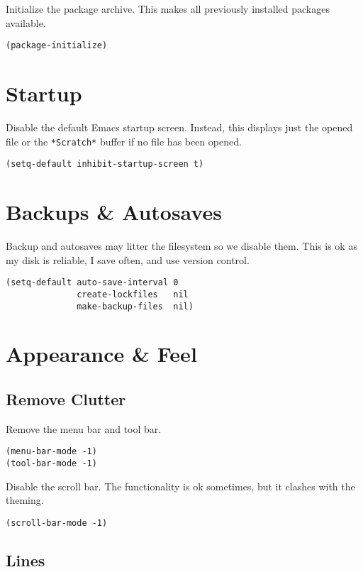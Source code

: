 \documentclass[11pt]{article}
\begin{document}
Initialize the package archive. This makes all previously installed packages available.

\begin{verbatim}
(package-initialize)
\end{verbatim}
\section{Startup}
\label{sec:orgd737570}

Disable the default Emacs startup screen. Instead, this displays just the opened
file or the \texttt{*Scratch*} buffer if no file has been opened.

\begin{verbatim}
(setq-default inhibit-startup-screen t)
\end{verbatim}
\section{Backups \& Autosaves}
\label{sec:org64d7226}

Backup and autosaves may litter the filesystem so we disable
them. This is ok as my disk is reliable, I save often, and use version
control.

\begin{verbatim}
(setq-default auto-save-interval 0
              create-lockfiles   nil
              make-backup-files  nil)
\end{verbatim}
\section{Appearance \& Feel}
\label{sec:org2a5bb84}

\subsection{Remove Clutter}
\label{sec:orge83e8ce}

Remove the menu bar and tool bar.

\begin{verbatim}
(menu-bar-mode -1)
(tool-bar-mode -1)
\end{verbatim}

Disable the scroll bar. The functionality is ok sometimes, but it clashes with
the theming.

\begin{verbatim}
(scroll-bar-mode -1)
\end{verbatim}
\subsection{Lines}
\label{sec:orgb0e77f2}
\end{document}
